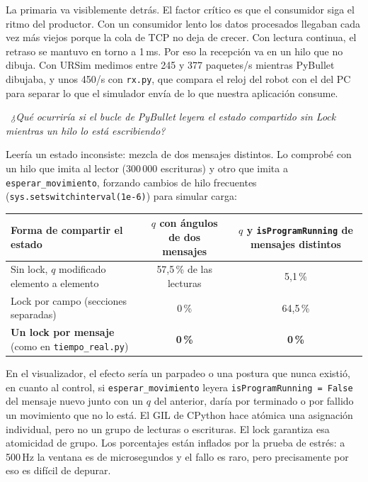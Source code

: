 \documentclass[10pt,a4paper]{article}
\newcommand{\code}[1]{\texttt{\small #1}}
\newcommand{\preg}[2]{\par\smallskip\noindent{\color{azul}\bfseries P#1.}~{\itshape #2}\par\nopagebreak}
\begin{document}
La primaria va visiblemente detrás. El factor crítico es que el consumidor siga el ritmo del productor. Con un consumidor lento los datos procesados llegaban cada vez más viejos porque la cola de TCP no deja de crecer. Con lectura continua, el retraso se mantuvo en torno a 1\,ms. Por eso la recepción va en un hilo que no dibuja. Con URSim medimos entre 245 y 377 paquetes/s mientras PyBullet dibujaba, y unos 450/s con \code{rx.py}, que compara el reloj del robot con el del PC para separar lo que el simulador envía de lo que nuestra aplicación consume.

\preg{8}{¿Qué ocurriría si el bucle de PyBullet leyera el estado compartido sin Lock
mientras un hilo lo está escribiendo?}
Leería un estado inconsiste: mezcla de dos mensajes distintos. Lo comprobé con un hilo que imita al lector (300\,000 escrituras) y otro que imita a \code{esperar\_movimiento}, forzando cambios de hilo frecuentes (\code{sys.setswitchinterval(1e-6)}) para simular carga:

\begin{center}\small
\begin{tabular}{@{}l c c@{}}
\toprule
Forma de compartir el estado & \shortstack{$q$ con ángulos\\de dos mensajes} & \shortstack{$q$ y \code{isProgramRunning}\\de mensajes distintos} \\ \midrule
Sin lock, $q$ modificado elemento a elemento & 57,5\,\% de las lecturas & 5,1\,\% \\
Lock por campo (secciones separadas) & 0\,\% & 64,5\,\% \\
\textbf{Un lock por mensaje} (como en \code{tiempo\_real.py}) & \textbf{0\,\%} & \textbf{0\,\%} \\ \bottomrule
\end{tabular}
\end{center}

En el visualizador, el efecto sería un parpadeo o una postura que nunca existió, en cuanto al control, si \code{esperar\_movimiento} leyera \code{isProgramRunning = False} del mensaje nuevo junto con un $q$ del anterior, daría por terminado o por fallido un movimiento que no lo está. El GIL de CPython hace atómica una asignación individual, pero no un grupo de lecturas o escrituras. El lock garantiza esa atomicidad de grupo. Los porcentajes están inflados por la prueba de estrés: a 500\,Hz la ventana es de microsegundos y el fallo es raro, pero precisamente por eso es difícil de depurar. 
\end{document}
